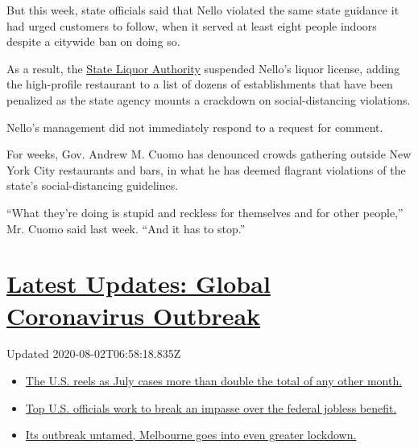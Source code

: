 But this week, state officials said that Nello violated the same state
guidance it had urged customers to follow, when it served at least eight
people indoors despite a citywide ban on doing so.

As a result, the \href{https://sla.ny.gov/}{State Liquor Authority}
suspended Nello's liquor license, adding the high-profile restaurant to
a list of dozens of establishments that have been penalized as the state
agency mounts a crackdown on social-distancing violations.

Nello's management did not immediately respond to a request for comment.

For weeks, Gov. Andrew M. Cuomo has denounced crowds gathering outside
New York City restaurants and bars, in what he has deemed flagrant
violations of the state's social-distancing guidelines.

``What they're doing is stupid and reckless for themselves and for other
people,'' Mr. Cuomo said last week. ``And it has to stop.''

\hypertarget{latest-updates-global-coronavirus-outbreak}{%
\section{\texorpdfstring{\href{https://www.nytimes.com/2020/08/01/world/coronavirus-covid-19.html?action=click\&pgtype=Article\&state=default\&region=MAIN_CONTENT_1\&context=storylines_live_updates}{Latest
Updates: Global Coronavirus
Outbreak}}{Latest Updates: Global Coronavirus Outbreak}}\label{latest-updates-global-coronavirus-outbreak}}

Updated 2020-08-02T06:58:18.835Z

\begin{itemize}
\tightlist
\item
  \href{https://www.nytimes.com/2020/08/01/world/coronavirus-covid-19.html?action=click\&pgtype=Article\&state=default\&region=MAIN_CONTENT_1\&context=storylines_live_updates\#link-34047410}{The
  U.S. reels as July cases more than double the total of any other
  month.}
\item
  \href{https://www.nytimes.com/2020/08/01/world/coronavirus-covid-19.html?action=click\&pgtype=Article\&state=default\&region=MAIN_CONTENT_1\&context=storylines_live_updates\#link-780ec966}{Top
  U.S. officials work to break an impasse over the federal jobless
  benefit.}
\item
  \href{https://www.nytimes.com/2020/08/01/world/coronavirus-covid-19.html?action=click\&pgtype=Article\&state=default\&region=MAIN_CONTENT_1\&context=storylines_live_updates\#link-2bc8948}{Its
  outbreak untamed, Melbourne goes into even greater lockdown.}
\end{itemize}

